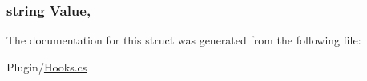 \subsubsection[{Value}]{\setlength{\rightskip}{0pt plus 5cm}string Value\hspace{0.3cm}{\ttfamily [get]}, {\ttfamily [set]}}\label{structOTA_1_1Plugin_1_1HookArgs_1_1ConfigurationLine_af7b88db799d8f791f785e437bc6099d2}


The documentation for this struct was generated from the following file\+:\begin{DoxyCompactItemize}
\item 
Plugin/\hyperlink{Hooks_8cs}{Hooks.\+cs}\end{DoxyCompactItemize}
